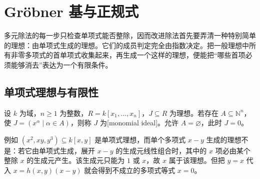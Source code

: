 

\section{Gröbner 基与正规式}
\label{b1:sec:F02}

多元除法的每一步只检查单项式能否整除，因而改进除法首先要弄清一种特别简单的理想：由单项式生成的理想。它们的成员判定完全由指数决定。把一般理想中所有非零多项式的首单项式收集起来，再生成一个这样的理想，便能把“哪些首项必须能够消去”表达为一个有限条件。

\subsection{单项式理想与有限性}
\label{b1:subsec:F02:01}

\begin{definition}\label{b1:def:F-monomial-ideal}
	设 \(k\) 为域，\(n\geq1\) 为整数，\(R=k[x_1,\ldots,x_n]\)，\(J\subseteq R\) 为理想。若存在 \(A\subseteq\mathbb N^n\)，使 \(J=(x^\alpha\mid\alpha\in A)\)，则称 \(J\) 为[monomial ideal]。允许 \(A=\varnothing\)，此时 \(J=0\)。
\end{definition}

例如 \((x^2,xy,y^3)\subseteq k[x,y]\) 是单项式理想，而单个多项式 \(x-y\) 生成的理想不是：若它由单项式生成，展开 \(x-y\) 的生成元线性组合时，其中的 \(x\) 项必由某个整除 \(x\) 的生成元产生。该生成元只能为 \(1\) 或 \(x\)，故 \(x\) 属于该理想。但把 \(y=x\) 代入 \(x=h(x,y)(x-y)\) 就会得到不成立的多项式等式 \(x=0\)。

